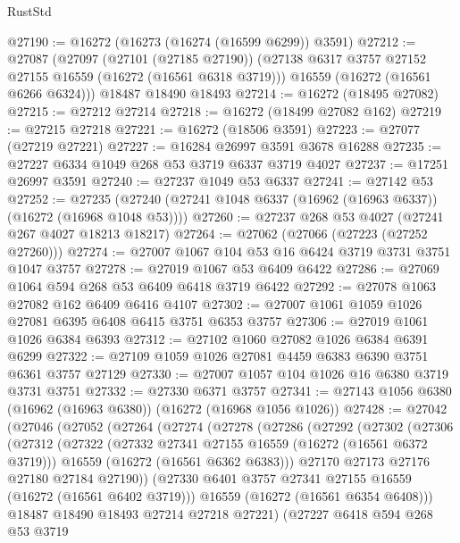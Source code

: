 \begin{lexlean}{RustStd}
\begin{coremodule}
@27190 := @16272 (@16273 (@16274 (@16599 @6299)) @3591)
@27212 := @27087
    (@27097
      (@27101 (@27185 @27190))
      (@27138 @6317 @3757 @27152 @27155 @16559 (@16272 (@16561 @6318 @3719)))
      @16559
      (@16272 (@16561 @6266 @6324)))
    @18487
    @18490
    @18493
@27214 := @16272 (@18495 @27082)
@27215 := @27212 @27214
@27218 := @16272 (@18499 @27082 @162)
@27219 := @27215 @27218
@27221 := @16272 (@18506 @3591)
@27223 := @27077 (@27219 @27221)
@27227 := @16284 @26997 @3591 @3678 @16288
@27235 := @27227 @6334 @1049 @268 @53 @3719 @6337 @3719 @4027
@27237 := @17251 @26997 @3591
@27240 := @27237 @1049 @53 @6337
@27241 := @27142 @53
@27252 := @27235 (@27240 (@27241 @1048 @6337 (@16962 (@16963 @6337)) (@16272 (@16968 @1048 @53))))
@27260 := @27237 @268 @53 @4027 (@27241 @267 @4027 @18213 @18217)
@27264 := @27062 (@27066 (@27223 (@27252 @27260)))
@27274 := @27007 @1067 @104 @53 @16 @6424 @3719 @3731 @3751 @1047 @3757
@27278 := @27019 @1067 @53 @6409 @6422
@27286 := @27069 @1064 @594 @268 @53 @6409 @6418 @3719 @6422
@27292 := @27078 @1063 @27082 @162 @6409 @6416 @4107
@27302 := @27007 @1061 @1059 @1026 @27081 @6395 @6408 @6415 @3751 @6353 @3757
@27306 := @27019 @1061 @1026 @6384 @6393
@27312 := @27102 @1060 @27082 @1026 @6384 @6391 @6299
@27322 := @27109 @1059 @1026 @27081 @4459 @6383 @6390 @3751 @6361 @3757 @27129
@27330 := @27007 @1057 @104 @1026 @16 @6380 @3719 @3731 @3751
@27332 := @27330 @6371 @3757
@27341 := @27143 @1056 @6380 (@16962 (@16963 @6380)) (@16272 (@16968 @1056 @1026))
@27428 := @27042
    (@27046
      (@27052
        (@27264
          (@27274
            (@27278
              (@27286
                (@27292
                  (@27302
                    (@27306
                      (@27312
                        (@27322
                          (@27332 @27341 @27155 @16559 (@16272 (@16561 @6372 @3719)))
                          @16559
                          (@16272 (@16561 @6362 @6383)))
                        @27170
                        @27173
                        @27176
                        @27180
                        @27184
                        @27190))
                    (@27330 @6401 @3757 @27341 @27155 @16559 (@16272 (@16561 @6402 @3719)))
                    @16559
                    (@16272 (@16561 @6354 @6408)))
                  @18487
                  @18490
                  @18493
                  @27214
                  @27218
                  @27221)
                (@27227
                  @6418
                  @594
                  @268
                  @53
                  @3719

\end{coremodule}
\end{lexlean}
